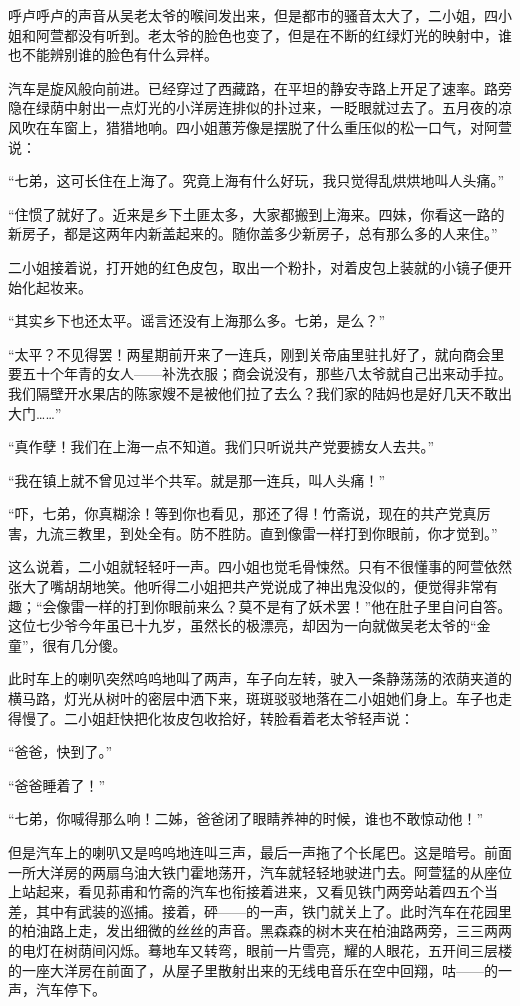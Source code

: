\par 呼卢呼卢的声音从吴老太爷的喉间发出来，但是都市的骚音太大了，二小姐，四小姐和阿萱都没有听到。老太爷的脸色也变了，但是在不断的红绿灯光的映射中，谁也不能辨别谁的脸色有什么异样。
\par 汽车是旋风般向前进。已经穿过了西藏路，在平坦的静安寺路上开足了速率。路旁隐在绿荫中射出一点灯光的小洋房连排似的扑过来，一眨眼就过去了。五月夜的凉风吹在车窗上，猎猎地响。四小姐蕙芳像是摆脱了什么重压似的松一口气，对阿萱说：
\par “七弟，这可长住在上海了。究竟上海有什么好玩，我只觉得乱烘烘地叫人头痛。”
\par “住惯了就好了。近来是乡下土匪太多，大家都搬到上海来。四妹，你看这一路的新房子，都是这两年内新盖起来的。随你盖多少新房子，总有那么多的人来住。”
\par 二小姐接着说，打开她的红色皮包，取出一个粉扑，对着皮包上装就的小镜子便开始化起妆来。
\par “其实乡下也还太平。谣言还没有上海那么多。七弟，是么？”
\par “太平？不见得罢！两星期前开来了一连兵，刚到关帝庙里驻扎好了，就向商会里要五十个年青的女人——补洗衣服；商会说没有，那些八太爷就自己出来动手拉。我们隔壁开水果店的陈家嫂不是被他们拉了去么？我们家的陆妈也是好几天不敢出大门……”
\par “真作孽！我们在上海一点不知道。我们只听说共产党要掳女人去共。”
\par “我在镇上就不曾见过半个共军。就是那一连兵，叫人头痛！”
\par “吓，七弟，你真糊涂！等到你也看见，那还了得！竹斋说，现在的共产党真厉害，九流三教里，到处全有。防不胜防。直到像雷一样打到你眼前，你才觉到。”
\par 这么说着，二小姐就轻轻吁一声。四小姐也觉毛骨悚然。只有不很懂事的阿萱依然张大了嘴胡胡地笑。他听得二小姐把共产党说成了神出鬼没似的，便觉得非常有趣；“会像雷一样的打到你眼前来么？莫不是有了妖术罢！”他在肚子里自问自答。这位七少爷今年虽已十九岁，虽然长的极漂亮，却因为一向就做吴老太爷的“金童”，很有几分傻。
\par 此时车上的喇叭突然呜呜地叫了两声，车子向左转，驶入一条静荡荡的浓荫夹道的横马路，灯光从树叶的密层中洒下来，斑斑驳驳地落在二小姐她们身上。车子也走得慢了。二小姐赶快把化妆皮包收拾好，转脸看着老太爷轻声说：
\par “爸爸，快到了。”
\par “爸爸睡着了！”
\par “七弟，你喊得那么响！二姊，爸爸闭了眼睛养神的时候，谁也不敢惊动他！”
\par 但是汽车上的喇叭又是呜呜地连叫三声，最后一声拖了个长尾巴。这是暗号。前面一所大洋房的两扇乌油大铁门霍地荡开，汽车就轻轻地驶进门去。阿萱猛的从座位上站起来，看见荪甫和竹斋的汽车也衔接着进来，又看见铁门两旁站着四五个当差，其中有武装的巡捕。接着，砰——的一声，铁门就关上了。此时汽车在花园里的柏油路上走，发出细微的丝丝的声音。黑森森的树木夹在柏油路两旁，三三两两的电灯在树荫间闪烁。蓦地车又转弯，眼前一片雪亮，耀的人眼花，五开间三层楼的一座大洋房在前面了，从屋子里散射出来的无线电音乐在空中回翔，咕——的一声，汽车停下。
